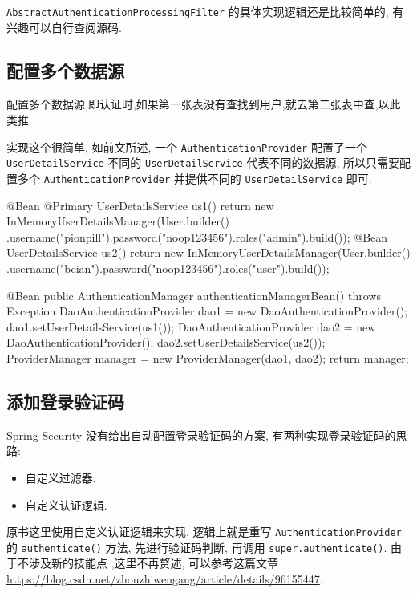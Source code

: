 \texttt{AbstractAuthenticationProcessingFilter} 的具体实现逻辑还是比较简单的, 有兴趣可以自行查阅源码.

\subsection{配置多个数据源}

配置多个数据源,即认证时,如果第一张表没有查找到用户,就去第二张表中查,以此类推.

实现这个很简单, 如前文所述, 一个 \texttt{AuthenticationProvider} 配置了一个 \texttt{UserDetailService} 不同的  \texttt{UserDetailService} 代表不同的数据源, 所以只需要配置多个 \texttt{AuthenticationProvider} 并提供不同的 \texttt{UserDetailService} 即可.

\begin{Java}
@Bean
@Primary
UserDetailsService us1() {
    return new InMemoryUserDetailsManager(User.builder()
      .username("pionpill").password("{noop}123456").roles("admin").build());
}
@Bean
UserDetailsService us2() {
    return new InMemoryUserDetailsManager(User.builder()
      .username("beian").password("{noop}123456").roles("user").build());
}

@Bean
public AuthenticationManager authenticationManagerBean() throws  Exception {
    DaoAuthenticationProvider dao1 = new DaoAuthenticationProvider();
    dao1.setUserDetailsService(us1());        
    DaoAuthenticationProvider dao2 = new DaoAuthenticationProvider();
    dao2.setUserDetailsService(us2());
    ProviderManager manager = new ProviderManager(dao1, dao2);
    return manager;
}
\end{Java}

\subsection{添加登录验证码}

Spring Security 没有给出自动配置登录验证码的方案, 有两种实现登录验证码的思路:
\begin{itemize}
  \item 自定义过滤器.
  \item 自定义认证逻辑.
\end{itemize}

原书这里使用自定义认证逻辑来实现. 逻辑上就是重写 \texttt{AuthenticationProvider} 的 \texttt{authenticate()} 方法, 先进行验证码判断, 再调用 \texttt{super.authenticate()}. 由于不涉及新的技能点 ,这里不再赘述, 可以参考这篇文章 \url{https://blog.csdn.net/zhouzhiwengang/article/details/96155447}.

\newpage